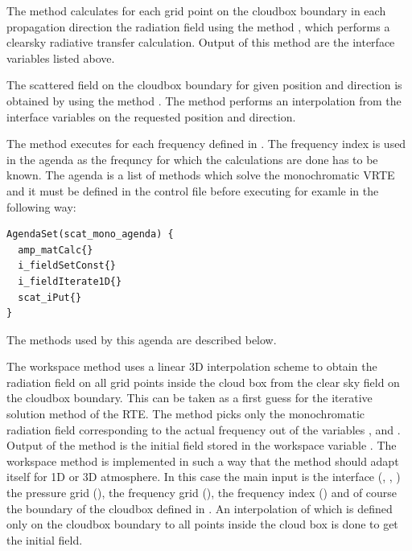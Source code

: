 The method  calculates
 for each grid point on the cloudbox boundary in each propagation direction
   the radiation field using the method , which 
   performs a clearsky radiative transfer calculation.
Output of this method are the interface variables listed above.

The scattered field on the cloudbox boundary for given position and direction is obtained by using the method . The method performs an interpolation from the interface variables on the requested position and direction.


\label{sec:scattering:scat_mono_ag}

The method   executes 
for each frequency defined in  . The frequency index  is used in the agenda as the frequncy for which the calculations are done has to be known. 
The agenda is a list of methods which solve the monochromatic VRTE and it must be defined in the control file before executing  for examle in the following way:

\begin{verbatim}
AgendaSet(scat_mono_agenda) {
  amp_matCalc{}
  i_fieldSetConst{}
  i_fieldIterate1D{}
  scat_iPut{}
}
\end{verbatim}

\noindent
The methods used by this agenda are described below.

 

The workspace method  
uses a linear 3D interpolation scheme to obtain the 
radiation field on all grid points inside the cloud box from the clear
sky field on the cloudbox boundary.
This can be taken as a first guess for the iterative solution method
of the RTE.  The method picks only the monochromatic radiation field
corresponding to the actual frequency out of the variables
,  and
. Output of the method is the initial field 
stored in the workspace variable . 
The workspace method  is implemented in such
a way that the method should adapt itself for  1D or 3D
atmosphere. In
this case the main input is the interface (, , )
the pressure grid (), the frequency grid
(), the frequency index () and
of course the boundary of the cloudbox defined in .  An interpolation of
 which is defined only on the cloudbox boundary to all points inside the cloud box is
done to get the initial field. \\

